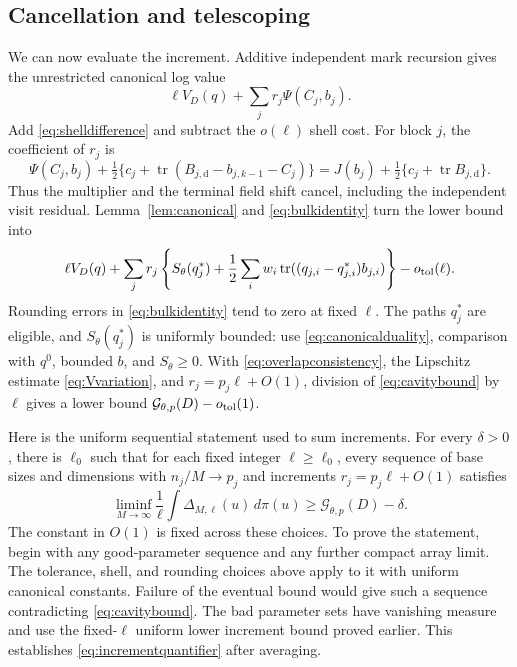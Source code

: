 \documentclass[11pt]{article}
\numberwithin{equation}{section}
\theoremstyle{definition}
\newcommand{\tr}{\operatorname{tr}}
\newcommand{\Gauss}{\mathcal G}
\begin{document}
\subsection{Cancellation and telescoping}
We can now evaluate the increment. Additive independent mark recursion gives the unrestricted canonical log value
\[
\ell V_D(q)+\sum_jr_j\Psi(C_j,b_j).
\]
Add \eqref{eq:shelldifference} and subtract the $o(\ell)$ shell cost. For block $j$, the coefficient of $r_j$ is
\[
\Psi(C_j,b_j)+\tfrac12\{c_j+\tr(B_{j,\mathrm d}-b_{j,k-1}-C_j)\}
=J(b_j)+\tfrac12\{c_j+\tr B_{j,\mathrm d}\}.
\]
Thus the multiplier and the terminal field shift cancel, including the independent visit residual. Lemma~\ref{lem:canonical} and \eqref{eq:bulkidentity} turn the lower bound into
\begin{equation}\label{eq:cavitybound}
\ell V_D(q)+\sum_jr_j\left\{
S_\theta(q_j^*)+\frac12\sum_iw_i
\tr((q_{j,i}-q^*_{j,i})b_{j,i})\right\}-o_{\rm tol}(\ell).
\end{equation}
Rounding errors in \eqref{eq:bulkidentity} tend to zero at fixed $\ell$. The paths $q_j^*$ are eligible, and $S_\theta(q_j^*)$ is uniformly bounded: use \eqref{eq:canonicalduality}, comparison with $q^0$, bounded $b$, and $S_\theta\ge0$. With \eqref{eq:overlapconsistency}, the Lipschitz estimate \eqref{eq:Vvariation}, and $r_j=p_j\ell+O(1)$, division of \eqref{eq:cavitybound} by $\ell$ gives a lower bound $\Gauss_{\theta,p}(D)-o_{\rm tol}(1)$.

Here is the uniform sequential statement used to sum increments. For every $\delta>0$, there is $\ell_0$ such that for each fixed integer $\ell\ge\ell_0$, every sequence of base sizes and dimensions with $n_j/M\to p_j$ and increments $r_j=p_j\ell+O(1)$ satisfies
\begin{equation}\label{eq:incrementquantifier}
\liminf_{M\to\infty}\frac1\ell\int\Delta_{M,\ell}(u)\,d\pi(u)
\ge\Gauss_{\theta,p}(D)-\delta.
\end{equation}
The constant in $O(1)$ is fixed across these choices. To prove the statement, begin with any good-parameter sequence and any further compact array limit. The tolerance, shell, and rounding choices above apply to it with uniform canonical constants. Failure of the eventual bound would give such a sequence contradicting \eqref{eq:cavitybound}. The bad parameter sets have vanishing measure and use the fixed-$\ell$ uniform lower increment bound proved earlier. This establishes \eqref{eq:incrementquantifier} after averaging.
\end{document}
